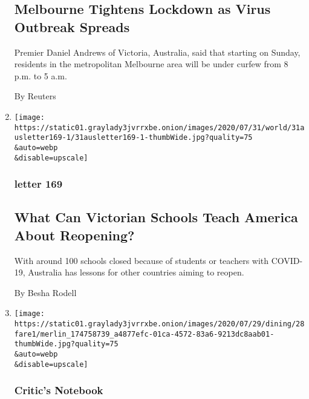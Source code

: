 \begin{enumerate}
  \hypertarget{melbourne-tightens-lockdown-as-virus-outbreak-spreads}{%
  \subsection{Melbourne Tightens Lockdown as Virus Outbreak
  Spreads}\label{melbourne-tightens-lockdown-as-virus-outbreak-spreads}}

  Premier Daniel Andrews of Victoria, Australia, said that starting on
  Sunday, residents in the metropolitan Melbourne area will be under
  curfew from 8 p.m. to 5 a.m.

  By Reuters
\item
  \href{/2020/07/30/world/australia/melbourne-schools-lessons-america.html}{}

  \texttt{[image: https://static01.graylady3jvrrxbe.onion/images/2020/07/31/world/31ausletter169-1/31ausletter169-1-thumbWide.jpg?quality=75\\\&auto=webp\\\&disable=upscale]}

  \hypertarget{letter-169}{%
  \subsubsection{letter 169}\label{letter-169}}

  \hypertarget{what-can-victorian-schools-teach-america-about-reopening}{%
  \subsection{What Can Victorian Schools Teach America About
  Reopening?}\label{what-can-victorian-schools-teach-america-about-reopening}}

  With around 100 schools closed because of students or teachers with
  COVID-19, Australia has lessons for other countries aiming to reopen.

  By Besha Rodell
\item
  \href{/2020/07/28/dining/melbourne-restaurants-coronavirus.html}{}

  \texttt{[image: https://static01.graylady3jvrrxbe.onion/images/2020/07/29/dining/28fare1/merlin\_174758739\_a4877efc-01ca-4572-83a6-9213dc8aab01-thumbWide.jpg?quality=75\\\&auto=webp\\\&disable=upscale]}

  \hypertarget{critics-notebook}{%
  \subsubsection{Critic's Notebook}\label{critics-notebook}}

  \hypertarget{the-pandemic-could-end-the-age-of-midpriced-dining}{%
}
\end{enumerate}
